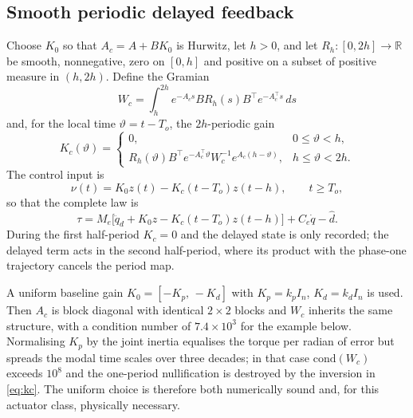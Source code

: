 \subsection{Smooth periodic delayed feedback}\label{sec:pdf}
Choose $K_0$ so that $A_c=A+BK_0$ is Hurwitz, let $h>0$, and let
$R_h:[0,2h]\to\mathbb R$ be smooth, nonnegative, zero on $[0,h]$ and positive
on a subset of positive measure in $(h,2h)$. Define the Gramian
\begin{equation}
 W_c=\int_h^{2h}e^{-A_cs}BR_h(s)B^\top e^{-A_c^\top s}\,ds
 \label{eq:wc}
\end{equation}
and, for the local time $\vartheta=t-T_o$, the $2h$-periodic gain
\begin{equation}
 K_c(\vartheta)=
 \begin{cases}
 0, & 0\le\vartheta<h,\\
 R_h(\vartheta)B^\top e^{-A_c^\top\vartheta}W_c^{-1}
 e^{A_c(h-\vartheta)}, & h\le\vartheta<2h .
 \end{cases}
 \label{eq:kc}
\end{equation}
The control input is
\begin{equation}
 \nu(t)=K_0z(t)-K_c(t-T_o)z(t-h),\qquad t\ge T_o,
 \label{eq:nu}
\end{equation}
so that the complete law is
\begin{equation}
 \tau=M_e\bigl[\ddot q_d+K_0z-K_c(t-T_o)z(t-h)\bigr]+C_e\dot q-\hat d .
 \label{eq:law}
\end{equation}
During the first half-period $K_c=0$ and the delayed state is only recorded;
the delayed term acts in the second half-period, where its product with the
phase-one trajectory cancels the period map.

\begin{remark}\label{rem:gains}
A uniform baseline gain $K_0=[-K_p,\,-K_d]$ with $K_p=k_pI_n$,
$K_d=k_dI_n$ is used. Then $A_c$ is block diagonal with identical $2\times2$
blocks and $W_c$ inherits the same structure, with a condition number of
$7.4\times10^3$ for the example below. Normalising $K_p$ by the joint inertia
equalises the torque per radian of error but spreads the modal time scales over
three decades; in that case $\mathrm{cond}(W_c)$ exceeds $10^8$ and the
one-period nullification is destroyed by the inversion in \eqref{eq:kc}. The
uniform choice is therefore both numerically sound and, for this actuator
class, physically necessary.
\end{remark}
